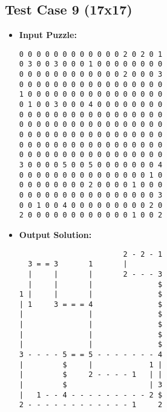 \subsection{Test Case 9 (17x17)}
\begin{itemize}
    \item \textbf{Input Puzzle:}
    \begin{verbatim}
0 0 0 0 0 0 0 0 0 0 0 0 2 0 2 0 1
0 3 0 0 3 0 0 0 1 0 0 0 0 0 0 0 0
0 0 0 0 0 0 0 0 0 0 0 0 2 0 0 0 3
0 0 0 0 0 0 0 0 0 0 0 0 0 0 0 0 0
1 0 0 0 0 0 0 0 0 0 0 0 0 0 0 0 0
0 1 0 0 3 0 0 0 4 0 0 0 0 0 0 0 0
0 0 0 0 0 0 0 0 0 0 0 0 0 0 0 0 0
0 0 0 0 0 0 0 0 0 0 0 0 0 0 0 0 0
0 0 0 0 0 0 0 0 0 0 0 0 0 0 0 0 0
0 0 0 0 0 0 0 0 0 0 0 0 0 0 0 0 0
0 0 0 0 0 0 0 0 0 0 0 0 0 0 0 0 0
3 0 0 0 0 5 0 0 5 0 0 0 0 0 0 0 4
0 0 0 0 0 0 0 0 0 0 0 0 0 0 0 1 0
0 0 0 0 0 0 0 0 2 0 0 0 0 1 0 0 0
0 0 0 0 0 0 0 0 0 0 0 0 0 0 0 0 3
0 0 1 0 0 4 0 0 0 0 0 0 0 0 0 2 0
2 0 0 0 0 0 0 0 0 0 0 0 0 1 0 0 2
    \end{verbatim}
    \item \textbf{Output Solution:}
    \begin{verbatim}
                        2 - 2 - 1
  3 = = 3       1       |        
  |     |       |       2 - - - 3
  |     |       |               $
1 |     |       |               $
| 1     3 = = = 4               $
|               |               $
|               |               $
|               |               $
|               |               $
3 - - - - 5 = = 5 - - - - - - - 4
|         $     |             1 |
|         $     2 - - - - 1   | |
|         $                   | 3
|   1 - - 4 - - - - - - - - - 2 $
2 - - - - - - - - - - - - 1     2
    \end{verbatim}
\end{itemize}

